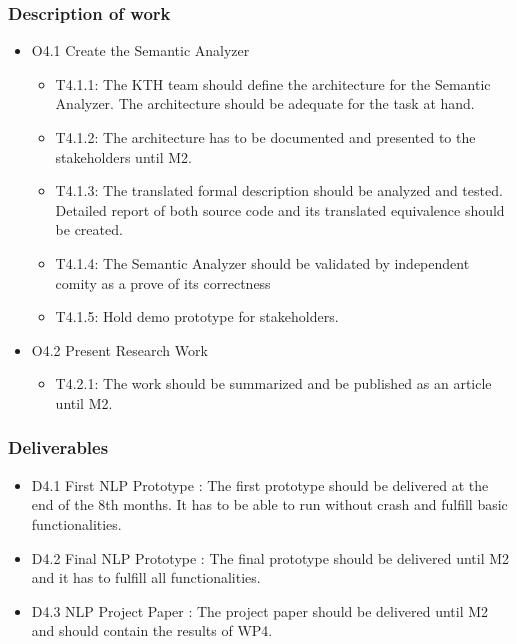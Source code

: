 \subsubsection{Description of work}
	\begin{itemize}
		\item O4.1 Create the Semantic Analyzer
		\begin{itemize}
			\item T4.1.1: The \gls{KTH} team should define the architecture for the Semantic Analyzer. The architecture should be adequate for the task at hand.
			\item T4.1.2: The architecture has to be documented and presented to the stakeholders until M2.
			\item T4.1.3: The translated formal description should be analyzed and tested. Detailed report of both source code and its translated equivalence should be created. 
			\item T4.1.4: The Semantic Analyzer should be validated by independent comity as a prove of its correctness  
			\item T4.1.5: Hold demo prototype for stakeholders.
		\end{itemize}
	
		\item O4.2 Present Research Work
		\begin{itemize}
			\item T4.2.1: The work should be summarized and be published as an article until M2. 
		\end{itemize}
	\end{itemize}
\subsubsection{Deliverables}
	\begin{itemize}
		\item D4.1 First \gls{NLP} Prototype : The first prototype should be delivered at the end of the 8th months. It has to be able to run without crash and fulfill basic functionalities.
		\item D4.2 Final \gls{NLP} Prototype : The final prototype should be delivered until M2 and it has to fulfill all functionalities.
		\item D4.3 \gls{NLP} Project Paper : The project paper should be delivered until M2 and should contain the results of WP4.
	\end{itemize}